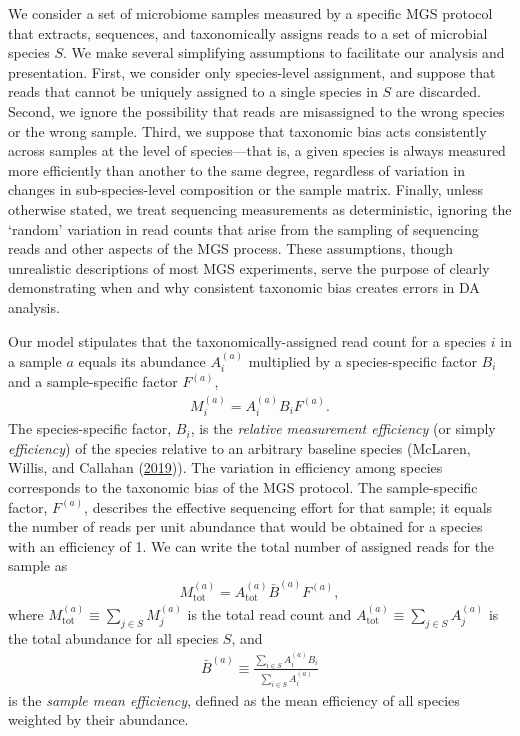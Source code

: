 \documentclass[
]{article}
\begin{document}
We consider a set of microbiome samples measured by a specific MGS protocol that extracts, sequences, and taxonomically assigns reads to a set of microbial species \(S\).
We make several simplifying assumptions to facilitate our analysis and presentation.
First, we consider only species-level assignment, and suppose that reads that cannot be uniquely assigned to a single species in \(S\) are discarded.
Second, we ignore the possibility that reads are misassigned to the wrong species or the wrong sample.
Third, we suppose that taxonomic bias acts consistently across samples at the level of species---that is, a given species is always measured more efficiently than another to the same degree, regardless of variation in changes in sub-species-level composition or the sample matrix.
Finally, unless otherwise stated, we treat sequencing measurements as deterministic, ignoring the `random' variation in read counts that arise from the sampling of sequencing reads and other aspects of the MGS process.
These assumptions, though unrealistic descriptions of most MGS experiments, serve the purpose of clearly demonstrating when and why consistent taxonomic bias creates errors in DA analysis.

Our model stipulates that the taxonomically-assigned read count for a species \(i\) in a sample \(a\) equals its abundance \(A_{i}^{(a)}\) multiplied by a species-specific factor \(B_{i}\) and a sample-specific factor \(F^{(a)}\),
\begin{align}
  \label{eq:mgs-model}
  M_i^{(a)} = A_i^{(a)} B_i F^{(a)}.
\end{align}
The species-specific factor, \(B_{i}\), is the \emph{relative measurement efficiency} (or simply \emph{efficiency}) of the species relative to an arbitrary baseline species (McLaren, Willis, and Callahan (\protect\hyperlink{ref-mclaren2019cons}{2019})).
The variation in efficiency among species corresponds to the taxonomic bias of the MGS protocol.
The sample-specific factor, \(F^{(a)}\), describes the effective sequencing effort for that sample; it equals the number of reads per unit abundance that would be obtained for a species with an efficiency of 1.
We can write the total number of assigned reads for the sample as
\begin{align}
  \label{eq:total-reads}
  M_{\text{tot}}^{(a)}
    = A_{\text{tot}}^{(a)} \bar B^{(a)} F^{(a)},
\end{align}
where
\(M_{{\text{tot}}}^{(a)} \equiv \sum_{j\in S} M_j^{(a)}\) is the total read count and \(A_{{\text{tot}}}^{(a)} \equiv \sum_{j\in S}A_j^{(a)}\) is the total abundance for all species \(S\), and
\begin{align}
  \label{eq:mean-efficiency}
  \bar B^{(a)} \equiv \frac{\sum_{i\in S} A_i^{(a)} B_i}{\sum_{i\in S} A_i^{(a)}}
\end{align}
is the \emph{sample mean efficiency}, defined as the mean efficiency of all species weighted by their abundance.
\end{document}
